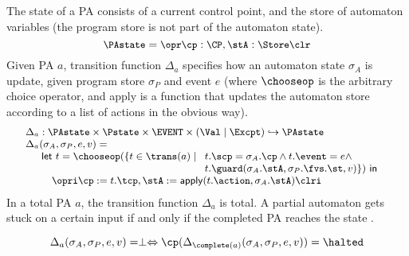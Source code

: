 The state of a PA consists of a current control point, and the store of
automaton variables (the program store is not part of the automaton state).
\[{\small
\PAstate = \opr \cp : \CP, \stA : \Store \clr}
\]
Given PA \(a\), transition function \(\Delta_a\) specifies how an
automaton state \(\sigma_A\) is update, given program store
\(\sigma_P\) and event \(e\) (where \(\chooseop\) is the arbitrary
choice operator, and \textsf{apply} is a function that updates the
automaton store according to a list of actions in the obvious way).
\[{\small
\begin{array}{l}
\Delta_a  :  \PAstate \times \Pstate \times \EVENT \times (\Val \mid
\Excpt) \hookrightarrow
\PAstate\\
\Delta_a(\sigma_A, \sigma_P, e, v) = \\
\quad
\begin{array}[t]{l}
\mathsf{let\ }t = \chooseop(\{t\in \trans(a)\mid
  \begin{array}[t]{l}
     t.\scp = \sigma_A.\cp \wedge t.\event = e \wedge \\
     t.\guard(\sigma_A.\stA, \sigma_P.\fvs.\st, v)\}) \mathsf{\ in}
  \end{array}\\
\quad \opri \cp := t.\tcp, \stA := \mathsf{apply}(t.\action,
\sigma_A.\stA) \clri
\end{array}

\end{array}}
\]
In a total PA $a$, the transition function \(\Delta_a\) is total.
A partial automaton gets stuck on a certain input if and only if the
completed PA reaches the state \halted.

\begin{equation}\label{PAcompletionProp}
\Delta_a(\sigma_A, \sigma_P, e, v) = \perp \Leftrightarrow
\cp (\Delta_{\complete(a)}(\sigma_A, \sigma_P, e, v)) = \halted
\end{equation}


